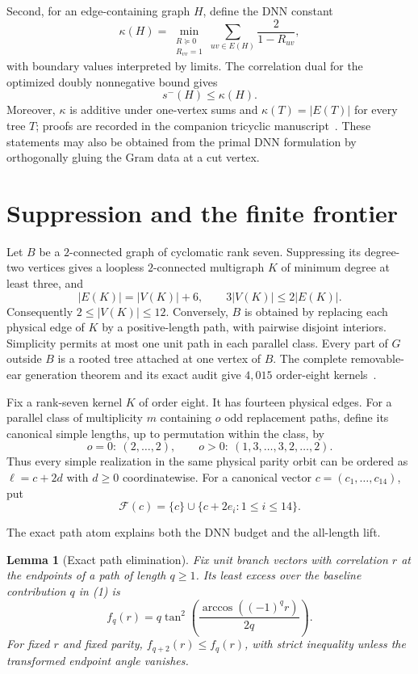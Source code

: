 \documentclass[11pt]{article}
\newtheorem{lemma}[theorem]{Lemma}
\theoremstyle{remark}
\newcommand{\sminus}{s^-}
\newcommand{\kappad}{\kappa}
\begin{document}
Second, for an edge-containing graph $H$, define the DNN constant
\[
 \kappad(H)=
 \min_{\substack{R\succeq0\\R_{vv}=1}}
 \sum_{uv\in E(H)}\frac{2}{1-R_{uv}},                       \tag{1}
\]
with boundary values interpreted by limits.  The correlation dual for the
optimized doubly nonnegative bound gives
\begin{equation}
 \sminus(H)\leq\kappad(H).                                  \tag{2}
\end{equation}
Moreover, $\kappad$ is additive under one-vertex sums and
$\kappad(T)=|E(T)|$ for every tree $T$; proofs are recorded in the companion
tricyclic manuscript~\cite{Tricyclic}.  These statements may also be obtained
from the primal DNN formulation by orthogonally gluing the Gram data at a cut
vertex.

\section{Suppression and the finite frontier}

Let $B$ be a $2$-connected graph of cyclomatic rank seven.  Suppressing its
degree-two vertices gives a loopless $2$-connected multigraph $K$ of minimum
degree at least three, and
\[
 |E(K)|=|V(K)|+6,
 \qquad
 3|V(K)|\leq2|E(K)|.
\]
Consequently $2\leq |V(K)|\leq12$.  Conversely, $B$ is obtained by replacing
each physical edge of $K$ by a positive-length path, with pairwise disjoint
interiors.  Simplicity permits at most one unit path in each parallel class.
Every part of $G$ outside $B$ is a rooted tree attached at one vertex of $B$.
The complete removable-ear generation theorem and its exact audit give
$4{,}015$ order-eight kernels~\cite{CensusTheorem}.

Fix a rank-seven kernel $K$ of order eight.  It has fourteen physical edges.
For a parallel class of multiplicity $m$ containing $o$ odd replacement
paths, define its canonical simple lengths, up to permutation within the
class, by
\[
 o=0:\ (2,\ldots,2),
 \qquad
 o>0:\ (1,3,\ldots,3,2,\ldots,2).                          \tag{3}
\]
Thus every simple realization in the same physical parity orbit can be
ordered as $\ell=c+2d$ with $d\geq0$ coordinatewise.  For a canonical vector
$c=(c_1,\ldots,c_{14})$, put
\[
 \mathcal F(c)=\{c\}\cup\{c+2e_i:1\leq i\leq14\}.          \tag{4}
\]

The exact path atom explains both the DNN budget and the all-length lift.

\begin{lemma}[Exact path elimination]\label{lem:path}
Fix unit branch vectors with correlation $r$ at the endpoints of a path of
length $q\geq1$.  Its least excess over the baseline contribution $q$ in
(1) is
\[
 f_q(r)=q\tan^2\!\left(
 \frac{\arccos((-1)^q r)}{2q}\right).                       \tag{5}
\]
For fixed $r$ and fixed parity,
$f_{q+2}(r)\leq f_q(r)$, with strict inequality unless the transformed
endpoint angle vanishes.
\end{lemma}
\end{document}
